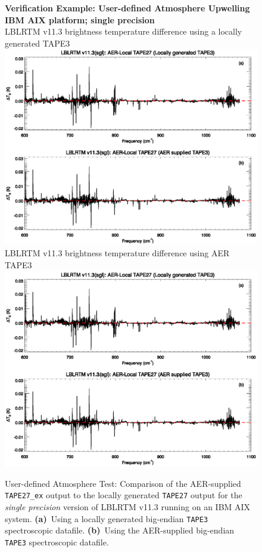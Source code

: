\begin{figure}[htp]
  \centering
  \qquad\sffamily\textbf{Verification Example: User-defined Atmosphere Upwelling}\\
  \qquad\sffamily\textbf{IBM AIX platform; single precision}\\
  \qquad\textsf{LBLRTM v11.3 brightness temperature difference using a locally generated TAPE3}\\
  \includegraphics[bb=85 403 534 558,clip,scale=1.0]{graphics/run_example_user_defined_upwelling/sgl_ibm.eps}
  \qquad\textsf{LBLRTM v11.3 brightness temperature difference using AER TAPE3}\\
  \includegraphics[bb=85 226 534 381,clip,scale=1.0]{graphics/run_example_user_defined_upwelling/sgl_ibm.eps}
  \caption{User-defined Atmosphere Test: Comparison of the AER-supplied \texttt{TAPE27\_ex} output to the locally generated \texttt{TAPE27} output for the \textsl{single precision} version of LBLRTM v11.3 running on an IBM AIX system. \mbox{\textbf{(a)} Using} a locally generated big-endian \texttt{TAPE3} spectroscopic datafile. \mbox{\textbf{(b)} Using} the AER-supplied big-endian \texttt{TAPE3} spectroscopic datafile.}
  \label{fig:run_example_user_defined_upwelling-sgl_ibm}
\end{figure}

